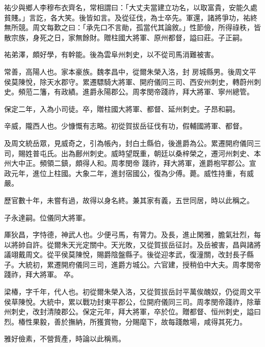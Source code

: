 \begin{pinyinscope}
 祐少與鄉人李穆布衣齊名，常相謂曰：「大丈夫當建立功名，以取富貴，安能久處貧賤。」言訖，各大笑。後皆如言。及從征伐，為士卒先。軍還，諸將爭功，祐終無所競。周文每歎之曰：「承先口不言勛，孤當代其論敘。」性節儉，所得祿秩，皆散宗族，身死之日，家無餘財。贈柱國大將軍、原州都督，謚曰莊。子正嗣。



 祐弟澤，頗好學，有幹能。後為雲阜州刺史，以不從司馬消難被害。



 常善，高陽人也。家本豪族。魏孝昌中，從爾朱榮入洛，封
 房城縣男。後周文平侯莫陳悅，除天水郡守。累遷驃騎大將軍、開府儀同三司、西安州刺史，轉蔚州刺史。頻蒞二籓，有政績。進爵永陽郡公。周孝閔帝踐祚，拜大將軍、寧州總管。



 保定二年，入為小司徒。卒，贈柱國大將軍、都督、延州刺史。子昂和嗣。



 辛威，隴西人也。少慷慨有志略。初從賀拔岳征伐有功，假輔國將軍、都督。



 及周文統岳眾，見威奇之，引為帳內，封白土縣伯，後進爵為公。累遷開府儀同三司，賜姓普屯氏。出為鄜州刺史。威時望既重，朝廷以桑梓榮之，遷河州刺史、本州大中正。頻領二鎮，頗得人和。周孝閔帝
 踐祚，拜大將軍，進爵枹罕郡公。宣政元年，進位上柱國。大象二年，進封宿國公，復為少傅。薨。威性持重，有威嚴。



 歷官數十年，未嘗有過，故得以身名終。兼其家有義，五世同居，時以此稱之。



 子永達嗣。位儀同大將軍。



 厙狄昌，字恃德，神武人也。少便弓馬，有膂力。及長，進止閑雅，膽氣壯烈，每以將帥自許。從爾朱天光定關中。天光敗，又從賀拔岳征討。及岳被害，昌與諸將議翊戴周文。從平侯莫陳悅，賜爵陰盤縣子。後從迎孝武，復潼關，改封長子縣子。大統初，累遷開府儀同三司，進爵方城公。六官建，授稍伯中大夫。周孝閔帝踐祚，拜大將軍。
 卒。



 梁椿，字千年，代人也。初從爾朱榮入洛，又從賀拔岳討平萬俟醜奴，仍從周文平侯草陳悅。大統中，累以戰功封東平郡公，位開府儀同三司。周孝閔帝踐祚，除華州刺史，改封清陵郡公。保定元年，拜大將軍，卒於位。贈都督、恒州刺史，謚曰烈。椿性果毅，善於撫納，所獲賞物，分賜麾下，故每踐敵場，咸得其死力。



 雅好儉素，不營貲產，時論以此稱焉。




\end{pinyinscope}

